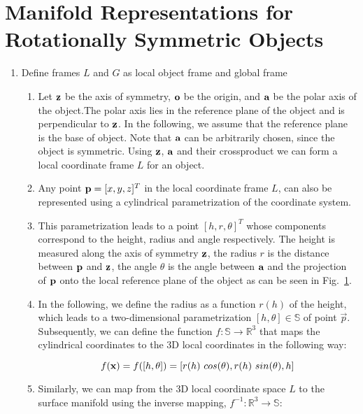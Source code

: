 \documentclass{aamas2015}
\begin{document}
\section{Manifold Representations for Rotationally Symmetric Objects}
\begin{enumerate}
	\item Define frames $L$ and $G$ as local object frame and global frame
	\begin{enumerate}
		\item 
		Let $\textbf{z}$ be the axis of symmetry, $\textbf{o}$ be the origin, and $\textbf{a}$ be the polar axis of the object.The polar axis lies in the reference plane of the object and is perpendicular to $\textbf{z}$. In the following, we assume that the reference plane is the base of object. Note that $\textbf{a}$ can be arbitrarily chosen, since the object is symmetric. Using $\textbf{z}$, $\textbf{a}$ and their crossproduct we can form a local coordinate frame $L$ for an object.
		
		\item Any point $\textbf{p} = [x,y,z]^T$ in the local coordinate frame $L$, can also be represented using a cylindrical parametrization of the coordinate system. 
		
		\item This parametrization leads to a point $[h, r, \theta]^T$ whose components correspond to the height, radius and angle respectively. The height is measured along the axis of symmetry $\textbf{z}$, the radius $r$ is the distance between $\textbf{p}$ and $\textbf{z}$, the angle $\theta$ is the angle between $\textbf{a}$ and the projection of $\textbf{p} $ onto the local reference plane of the object as can be seen in Fig.~\ref{}. 
		
		\item In the following, we define the radius as a function $r(h)$ of the height, which leads to a two-dimensional parametrization $[h, \theta] \in \mathbb{S}$ of point $\vec{p}$. Subsequently, we can define the function $f: \mathbb{S} \rightarrow \mathbb{R}^3$ that maps the cylindrical coordinates to the 3D local coordinates in the following way:
		
		\begin{equation}
			f(\textbf{x}) = f([h, \theta]) = [r(h) ~ cos(\theta), r(h) ~ sin(\theta), h]
		\end{equation}
		
		\item Similarly, we can map from the 3D local coordinate space $L$ to the 
		surface manifold using the inverse mapping, $f^{-1}: \mathbb{R}^3 \rightarrow \mathbb{S}$:
		

\end{enumerate}
\end{enumerate}
\end{document}
